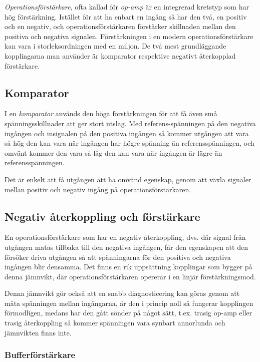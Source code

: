 \emph{Operationsförstärkare}, ofta kallad för \emph{op-amp} är en integrerad
kretstyp som har hög förstärkning.
Istället för att ha enbart en ingång så har den två, en positiv
och en negativ, och operationsförstärkaren förstärker skillnaden mellan den
positiva och negativa signalen. Förstärkningen i en modern operationsförstärkare
kan vara i storleksordningen med en miljon.
De två mest grundläggande kopplingarna man använder är komparator respektive
negativt återkopplad förstärkare.

\subsection{Komparator}

I en \emph{komparator} används den höga förstärkningen för att få även små
spänningsskillnader att ger stort utslag. Med referens-spänningen på den
negativa ingången och insignalen på den positiva ingången så kommer utgången
att vara så hög den kan vara när ingången har högre spänning än
referensspänningen, och omvänt kommer den vara så låg den kan vara när ingången
är lägre än referensspänningen.

Det är enkelt att få utgången att ha omvänd egenskap, genom att växla signaler
mellan positiv och negativ ingång på operationsförstärkaren.

\subsection{Negativ återkoppling och förstärkare}

En operationsförstärkare som har en negativ återkoppling, dvs. där signal från
utgången matas tillbaka till den negativa ingången, får den egenskapen att den
försöker driva utgången så att spänningarna för den positiva och negativa
ingången blir densamma.
Det finns en rik uppsättning kopplingar som bygger på denna jämnvikt, där
operationsförstärkaren opererar i en linjär förstärkningsmod.

Denna jämnvikt gör också att en snabb diagnosticering kan göras genom att mäta
spänningen mellan ingångarna, är den i princip noll så fungerar kopplingen
förmodligen, medans har den gått sönder på något sätt, t.ex. trasig op-amp
eller trasig återkoppling så kommer spänningen vara synbart annorlunda och
jämnvikten finns inte.

\subsubsection{Bufferförstärkare}

